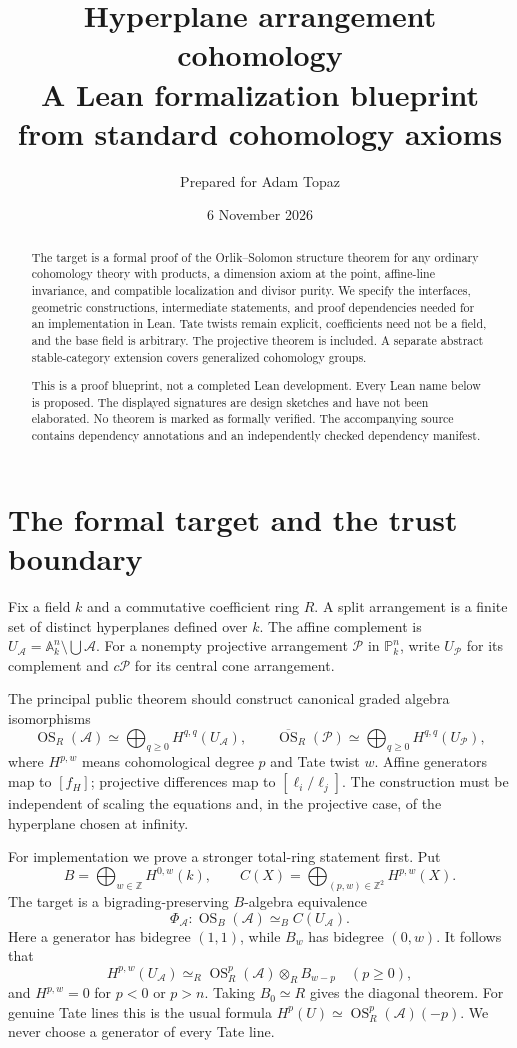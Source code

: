 \documentclass[11pt]{article}
\title{Hyperplane arrangement cohomology\\\large A Lean formalization blueprint from standard cohomology axioms}
\author{Prepared for Adam Topaz}
\date{6 November 2026}
\newcommand{\A}{\mathbb A}
\newcommand{\PP}{\mathbb P}
\newcommand{\Z}{\mathbb Z}
\newcommand{\cA}{\mathcal A}
\newcommand{\cP}{\mathcal P}
\newcommand{\OS}{\operatorname{OS}}
\newcommand{\pOS}{\overline{\operatorname{OS}}}
\newcommand{\logc}[1]{[#1]}
\theoremstyle{definition}
\theoremstyle{remark}
\begin{document}
\maketitle
\begin{abstract}
The target is a formal proof of the Orlik--Solomon structure theorem for any ordinary cohomology theory with products, a dimension axiom at the point, affine-line invariance, and compatible localization and divisor purity. We specify the interfaces, geometric constructions, intermediate statements, and proof dependencies needed for an implementation in Lean. Tate twists remain explicit, coefficients need not be a field, and the base field is arbitrary. The projective theorem is included. A separate abstract stable-category extension covers generalized cohomology groups.

This is a proof blueprint, not a completed Lean development. Every Lean name below is proposed. The displayed signatures are design sketches and have not been elaborated. No theorem is marked as formally verified. The accompanying source contains dependency annotations and an independently checked dependency manifest.
\end{abstract}
\clearpage
\tableofcontents
\newpage
\section{The formal target and the trust boundary}

Fix a field $k$ and a commutative coefficient ring $R$. A split arrangement is a finite set of distinct hyperplanes defined over $k$. The affine complement is $U_{\cA}=\A^n_k\setminus\bigcup\cA$. For a nonempty projective arrangement $\cP$ in $\PP^n_k$, write $U_{\cP}$ for its complement and $c\cP$ for its central cone arrangement.

The principal public theorem should construct canonical graded algebra isomorphisms
\[
 \OS_R(\cA)\simeq\bigoplus_{q\geq0}H^{q,q}(U_{\cA}),\qquad
 \pOS_R(\cP)\simeq\bigoplus_{q\geq0}H^{q,q}(U_{\cP}),
\]
where $H^{p,w}$ means cohomological degree $p$ and Tate twist $w$. Affine generators map to $\logc{f_H}$; projective differences map to $\logc{\ell_i/\ell_j}$. The construction must be independent of scaling the equations and, in the projective case, of the hyperplane chosen at infinity.

For implementation we prove a stronger total-ring statement first. Put
\[
 B=\bigoplus_{w\in\Z}H^{0,w}(k),\qquad
 C(X)=\bigoplus_{(p,w)\in\Z^2}H^{p,w}(X).
\]
The target is a bigrading-preserving $B$-algebra equivalence
\[
 \Phi_{\cA}:\OS_B(\cA)\simeq_B C(U_{\cA}).
\]
Here a generator has bidegree $(1,1)$, while $B_w$ has bidegree $(0,w)$. It follows that
\[
 H^{p,w}(U_{\cA})\simeq_R
 \OS_R^p(\cA)\otimes_R B_{w-p}\quad(p\geq0),
\]
and $H^{p,w}=0$ for $p<0$ or $p>n$. Taking $B_0\simeq R$ gives the diagonal theorem. For genuine Tate lines this is the usual formula $H^p(U)\simeq\OS_R^p(\cA)(-p)$. We never choose a generator of every Tate line.
\end{document}
